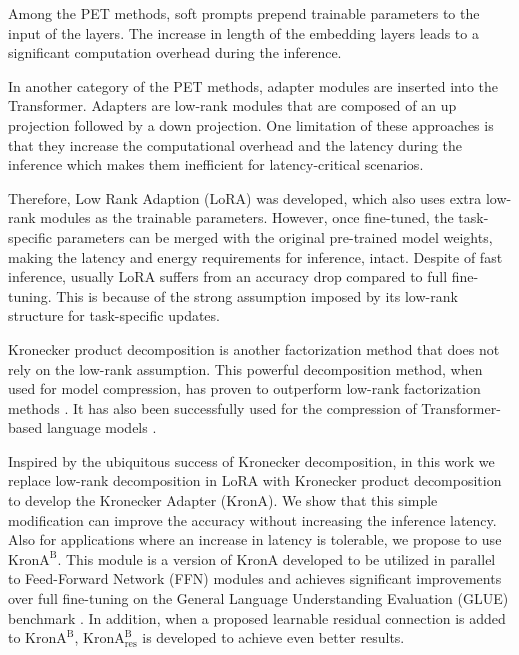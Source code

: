 Among the PET methods, soft prompts \cite{li-liang-2021-prefix,lester2021power} prepend trainable parameters to the input of the layers. The increase in length of the embedding layers leads to a significant computation overhead during the inference. 

In another category of the PET methods, adapter modules are inserted  \cite{pmlr-v97-houlsby19a,karimi2021compacter,he2022towards} into the Transformer. Adapters are low-rank modules that are composed of an up projection followed by a down projection. One limitation of these approaches is that they increase the computational overhead and the latency during the inference which makes them inefficient for latency-critical scenarios. 

Therefore, Low Rank Adaption (LoRA) \cite{hu2021lora} was developed, which also uses extra low-rank modules as the trainable parameters. However, once fine-tuned, the task-specific parameters can be merged with the original pre-trained model weights,  making the latency and energy requirements for inference, intact. Despite of fast inference, usually LoRA suffers from an accuracy drop compared to full fine-tuning. This is because of the strong assumption imposed by its low-rank structure for task-specific updates. 

Kronecker product decomposition is another factorization method that does not rely on the low-rank assumption. This powerful decomposition method, when used for model compression, has proven to outperform low-rank factorization methods \cite{thakker2019pushing,hameed2021convolutional}. It has also been successfully used for the compression of Transformer-based language models \cite{tahaei2021kroneckerbert,edalati2021kronecker}.

Inspired by the ubiquitous success of Kronecker decomposition, in this work we replace low-rank decomposition in LoRA with Kronecker product decomposition to develop the Kronecker Adapter (KronA). We show that this simple modification can improve the accuracy without increasing the inference latency. Also for applications where an increase in latency is tolerable, we propose to use $\text{KronA}^\text{B}$. This module is a version of KronA developed to be utilized in parallel to Feed-Forward Network (FFN) modules and achieves significant improvements over full fine-tuning on the General Language Understanding Evaluation (GLUE) benchmark \cite{wang-etal-2018-glue}. In addition, when a proposed learnable residual connection is added to $\text{KronA}^\text{B}$, $\text{KronA}^\text{B}_\text{res}$ is developed to achieve even better results.

